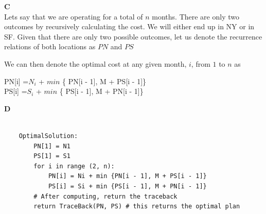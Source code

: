 \documentclass[11pt]{article}
\begin{document}
\begin{solution}
	\hfil
	
	
	\textbf{C}\\
	
	Lets say that we are operating for a total of $n$ months. There are only two outcomes by recursively calculating the cost. We will either end up in NY or in SF. Given that there are only two possible outcomes, let us denote the recurrence relations of both locations as $PN$ and $PS$
	
	\hfil
		
		We can then denote the optimal cost at any given month, $i$, from $1$ to $n$ as 
		
		\hfil
		
		\begin{center}
			PN[i] =$N_i$ + $min$ \{ PN[i - 1], M + PS[i - 1]\} \\
			PS[i] =$S_i$ + $min$ \{ PS[i - 1], M + PN[i - 1]\} \\
				
		\end{center}
		
		\hfil
		
		
	
	\textbf{D}\\
	
	
    
    
	\begin{lstlisting}
	
	OptimalSolution:
		PN[1] = N1
		PS[1] = S1
		for i in range (2, n):
			PN[i] = Ni + min {PN[i - 1], M + PS[i - 1]}
			PS[i] = Si + min {PS[i - 1], M + PN[i - 1]}
		# After computing, return the traceback
		return TraceBack(PN, PS) # this returns the optimal plan
	
		 
	\end{lstlisting}

	
	
	
\end{solution}
\end{document}
